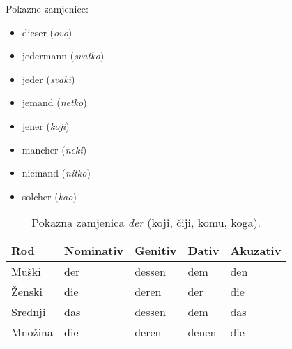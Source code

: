 \documentclass[12pt,german]{article}
\newcommand{\prijevod}[2]{\item #1 (\emph{#2})}
\begin{document}
\begin{multicols}{2}
Pokazne zamjenice:
\begin{itemize}[nolistsep, label={}]
    \prijevod{dieser}{ovo}
    \prijevod{jedermann}{svatko}
    \prijevod{jeder}{svaki}
    \prijevod{jemand}{netko}
    \prijevod{jener}{koji}
    \prijevod{mancher}{neki}
    \prijevod{niemand}{nitko}
    \prijevod{solcher}{kao}
\end{itemize}

\begin{table}[H]
  \caption{Pokazna zamjenica \emph{der} (koji, čiji, komu, koga).}
\begin{tabular}{@{} lllll @{}}
\toprule
Rod & Nominativ & Genitiv & Dativ & Akuzativ \\
\midrule
Muški & der & dessen & dem & den \\
Ženski & die & deren & der & die \\
Srednji & das & dessen & dem & das \\
Množina & die & deren & denen & die \\
\bottomrule
\end{tabular}
\end{table}


\end{multicols}
\end{document}
